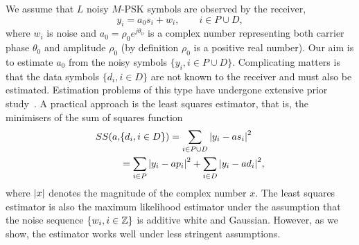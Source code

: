 \documentclass[journal]{IEEEtran}
\begin{document}
We assume that %
$L$ noisy $M$-PSK symbols are observed by the receiver,  %
\begin{equation}\label{eq:sigmod}
y_i = a_0 s_i + w_i, \qquad i \in P \cup D,
\end{equation}
where $w_i$ is noise and $a_0 = \rho_0 e^{j\theta_0}$ is a complex number representing both carrier phase $\theta_0$ and amplitude $\rho_0$ (by definition $\rho_0$ is a positive real number).  Our aim is to estimate $a_0$ from the noisy symbols $\{ y_i, i \in P \cup D \}$.  Complicating matters is that the data symbols $\{d_i, i \in D\}$ are not known to the receiver and must also be estimated.  Estimation problems of this type have undergone extensive prior study~\cite{ViterbiViterbi_phase_est_1983,Cowley_ref_sym_carr_1998,Wilson1989,Makrakis1990,Liu1991,Mackenthun1994,Sweldens2001,McKilliamLinearTimeBlockPSK2009,Divsalar1990}.  A practical approach is the least squares estimator, that is, the minimisers of the sum of squares function
\begin{equation}\label{eq:SSdefn}
\begin{split}
SS(a, &\{d_i, i \in D\}) = \sum_{i \in P \cup D} {\left\vert  y_i - a s_i  \right\vert}^2  \\
&= \sum_{i \in P} {\left\vert  y_i - a p_i  \right\vert}^2 + \sum_{i \in D} {\left\vert  y_i - a d_i  \right\vert}^2,
\end{split}
\end{equation}
where ${\left\vert x \right\vert}$ denotes the magnitude of the complex number $x$.  The least squares estimator is also the maximum likelihood estimator under the assumption that the noise sequence $\{w_i, i \in {\mathbb Z}\}$ is additive white and Gaussian.  However, as we show, the estimator works well under less stringent assumptions.  %
\end{document}
